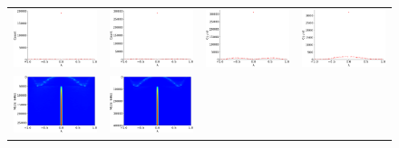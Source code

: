 \documentclass[senior,final,11pt]{iscs-thesis}
\begin{document}
\begin{figure}[htbp]
  \setlength\tabcolsep{0pt}
  \hspace{-3.0cm}
  \begin{tabular}{cccc}
    \includegraphics[width=45mm]{figure/tech-as-caida2007mtx_dos.png} &
    \includegraphics[width=45mm]{figure/tech-internet-asmtx_dos.png} &
    \includegraphics[width=45mm]{figure/tech-p2p-gnutellamtx_dos.png} &
    \includegraphics[width=45mm]{figure/tech-WHOISmtx_dos.png} \\
    \includegraphics[width=45mm]{figure/tech-as-caida2007mtx_pdos.png} &
    \includegraphics[width=45mm]{figure/tech-internet-asmtx_pdos.png} &

\end{tabular}
\end{figure}
\end{document}
